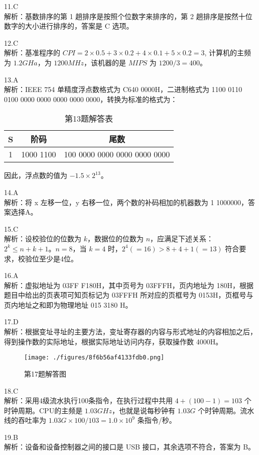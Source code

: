 11.C \\
解析：基数排序的第 1 趟排序是按照个位数字来排序的，第 2 趟排序是按然十位数字的大小进行排序的，答案是 C 选项。 

12.C \\
解析：基准程序的 $CPI=2 \times 0.5 + 3 \times 0.2 + 4 \times 0.1 + 5 \times 0.2 = 3$, 计算机的主频为 $1.2GHa$，为 $1200MHz$，该机器的是 $MIPS$ 为 $1 200/3=400$。

13.A \\
解析：IEEE 754 单精度浮点数格式为 C640 0000H，二进制格式为 1100 0110 0100 0000 0000 0000 0000 0000，转换为标准的格式为： 
\begin{table}[ht]
\centering
\caption{第13题解答表}\label{tab_CSN13_7}
\begin{tabular}{|c|c|c|}
\hline
S & 阶码 & 尾数 \\
\hline
1 & 1000 1100 & 100 0000 0000 0000 0000 0000 \\
\hline
\end{tabular}
\end{table}
因此，浮点数的值为 $-1.5 \times 2^{13}$。

14.A \\
解析：将 x 左移一位，y 右移一位，两个数的补码相加的机器数为 1 1000000，答案选择A。

15.C \\
解析：设校验位的位数为 $k$，数据位的位数为 $n$，应满足下述关系：$2^k \leq n+k+1$。$n=8$，当 $k=4$ 时，$2^4(=16)>8+4+1(=13)$ 符合要求，校验位至少是4位。

16.A \\
解析：虚拟地址为 03FF F180H，其中页号为 03FFFH，页内地址为 180H，根据题目中给出的页表项可知页标记为 03FFFH 所对应的页框号为 0153H，页框号与页内地址之和即为物理地址 015 3180 H。

17.D \\
解析：根据变址寻址的主要方法，变址寄存器的内容与形式地址的内容相加之后，得到操作数的实际地址，根据实际地址访问内存，获取操作数 4000H。
\begin{figure}[ht]
\centering
\texttt{[image: ./figures/8f6b56af4133fdb0.png]}
\caption{第17题解答图} \label{fig_CSN13_11}
\end{figure}

18.C \\
解析：采用4级流水执行100条指令，在执行过程中共用 $4+(100-1)=103$ 个时钟周期。CPU的主频是 $1.03GHz$，也就是说每秒钟有 $1.03G$ 个时钟周期。流水线的吞吐率为 $1.03G\times100/103=1.0\times10^9$ 条指令/秒。

19.B \\
解析：设备和设备控制器之间的接口是 USB 接口，其余选项不符合，答案为 B。

